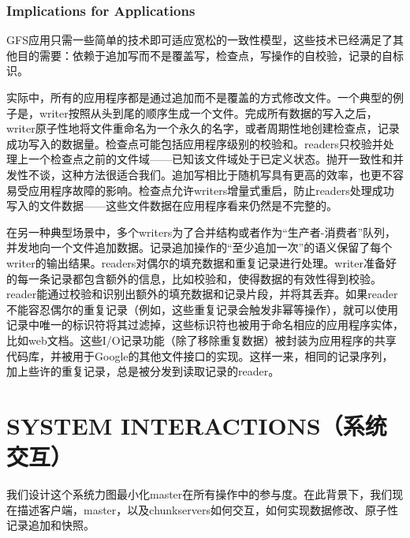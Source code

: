 \documentclass{article}
\begin{document}
\subsubsection{Implications for Applications}
GFS应用只需一些简单的技术即可适应宽松的一致性模型，这些技术已经满足了其他目的需要：依赖于追加写而不是覆盖写，检查点，写操作的自校验，记录的自标识。\par
实际中，所有的应用程序都是通过追加而不是覆盖的方式修改文件。一个典型的例子是，writer按照从头到尾的顺序生成一个文件。完成所有数据的写入之后，writer原子性地将文件重命名为一个永久的名字，或者周期性地创建检查点，记录成功写入的数据量。检查点可能包括应用程序级别的校验和。readers只校验并处理上一个检查点之前的文件域——已知该文件域处于已定义状态。抛开一致性和并发性不谈，这种方法很适合我们。追加写相比于随机写具有更高的效率，也更不容易受应用程序故障的影响。检查点允许writers增量式重启，防止readers处理成功写入的文件数据——这些文件数据在应用程序看来仍然是不完整的。\par
在另一种典型场景中，多个writers为了合并结构或者作为“生产者-消费者”队列，并发地向一个文件追加数据。记录追加操作的“至少追加一次”的语义保留了每个writer的输出结果。readers对偶尔的填充数据和重复记录进行处理。writer准备好的每一条记录都包含额外的信息，比如校验和，使得数据的有效性得到校验。reader能通过校验和识别出额外的填充数据和记录片段，并将其丢弃。如果reader不能容忍偶尔的重复记录（例如，这些重复记录会触发非幂等操作），就可以使用记录中唯一的标识符将其过滤掉，这些标识符也被用于命名相应的应用程序实体，比如web文档。这些I/O记录功能（除了移除重复数据）被封装为应用程序的共享代码库，并被用于Google的其他文件接口的实现。这样一来，相同的记录序列，加上些许的重复记录，总是被分发到读取记录的reader。

\section{SYSTEM INTERACTIONS（系统交互）}
我们设计这个系统力图最小化master在所有操作中的参与度。在此背景下，我们现在描述客户端，master，以及chunkservers如何交互，如何实现数据修改、原子性记录追加和快照。
\end{document}
